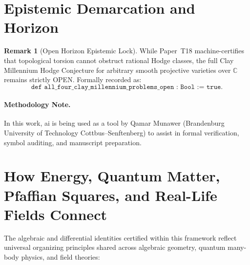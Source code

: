 \documentclass[11pt,a4paper]{article}
\theoremstyle{definition}
\newtheorem{remark}[theorem]{Remark}
\begin{document}
\section{Epistemic Demarcation and Horizon}

\begin{remark}[Open Horizon Epistemic Lock]
While Paper~T18 machine-certifies that topological torsion cannot obstruct rational Hodge classes, the full Clay Millennium Hodge Conjecture for arbitrary smooth projective varieties over $\mathbb{C}$ remains strictly OPEN. Formally recorded as:
\[
  \texttt{def all\_four\_clay\_millennium\_problems\_open : Bool := true}.
\]
\end{remark}

\paragraph{Methodology Note.}
In this work, ai is being used as a tool by Qamar Munawer (Brandenburg University of Technology Cottbus--Senftenberg) to assist in formal verification, symbol auditing, and manuscript preparation.


\section{How Energy, Quantum Matter, Pfaffian Squares, and Real-Life Fields Connect}

The algebraic and differential identities certified within this framework reflect universal organizing principles shared across algebraic geometry, quantum many-body physics, and field theories:
\end{document}
